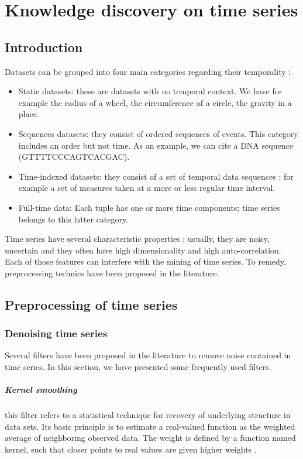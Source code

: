 \chapter{Knowledge discovery on time series}

\section{Introduction}

Datasets can be grouped into four main categories regarding their temporality \cite{roddick2002survey} : 
\begin{itemize}
\item Static datasets: these are datasets with no temporal context. We have for example the radius of a wheel, the circumference of a circle, the gravity in a place.
\item Sequences datasets: they consist of   ordered sequences of events. This category includes an order but not time. As an example, we can cite a DNA sequence (GTTTTCCCAGTCACGAC).
\item Time-indexed datasets: they consist of a set of temporal data sequences ; for example a set of measures taken at a more or less regular time interval.
\item Full-time data: Each tuple has one or more time components; time series belongs to this latter category.
\end{itemize}

Time series have several characteristic properties : usually, they are noisy, uncertain and  
they often have high dimensionality and high auto-correlation. Each of those features can interfere with the mining of time series.  To remedy, preprocessing technics have been proposed in the literature.
\section{Preprocessing of time series}


\subsection{Denoising time series}
Several filters have been proposed in the literature to remove noise contained in time series. In this section, we have presented some frequently used filters.
\paragraph{Kernel smoothing} this filter refers to a statistical technique for recovery of underlying structure in data sets. Its basic principle is to estimate a real-valued function as the weighted average of neighboring observed data. The weight is defined by a function named kernel, such that closer points to real values are given higher weights \cite{wand1994kernel}.

